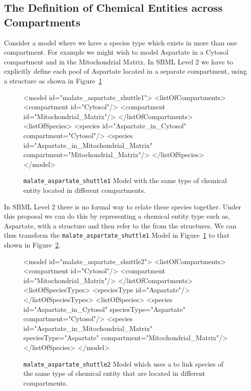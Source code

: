 \documentclass{cekarticle}
\begin{document}
\subsection{The Definition of Chemical Entities across Compartments}
\label{sec:commonspecies}

Consider a model where we have a species type which exists in more than one compartment.
For example we might wish to model Aspartate in a Cytosol compartment and in the Mitochondrial Matrix.
In SBML Level 2 we have to explicitly define each pool of Aspartate located in a separate compartment,
using a  structure as shown in Figure~\ref{fig:malate_aspartate_shuttle1-xml}

\begin{figure}[h]
\begin{example}
<model id="malate_aspartate_shuttle1">
    <listOfCompartments>
        <compartment id="Cytosol"/>
        <compartment id="Mitochondrial_Matrix"/>
    </listOfCompartments>
    <listOfSpecies>
        <species id="Aspartate_in_Cytosol" compartment="Cytosol"/>
        <species id="Aspartate_in_Mitochondrial_Matrix" compartment="Mitochondrial_Matrix"/>
    </listOfSpecies>
</model>
\end{example}
\caption{\texttt{malate\_aspartate\_shuttle1} Model with the same type of chemical entity located in
different compartments.}
\label{fig:malate_aspartate_shuttle1-xml}
\end{figure}

In SBML Level 2 there is no formal way to relate these species together.  Under this proposal
we can do this by representing a chemical entity type such as, Aspartate,
with a  structure and then
refer to the  from the  structures.  We can thus transform the
\texttt{malate\_aspartate\_shuttle1} Model in Figure~\ref{fig:malate_aspartate_shuttle1-xml} to that
shown in Figure~\ref{fig:malate_aspartate_shuttle2-xml}.

\begin{figure}[h]
\begin{example}
<model id="malate_aspartate_shuttle2">
    <listOfCompartments>
        <compartment id="Cytosol"/>
        <compartment id="Mitochondrial_Matrix"/>
    </listOfCompartments>
    <listOfSpeciesTypes>
        <speciesType id="Aspartate"/>
    </listOfSpeciesTypes>
    <listOfSpecies>
        <species
            id="Aspartate_in_Cytosol"
            speciesType="Aspartate"
            compartment="Cytosol"/>
        <species
            id="Aspartate_in_Mitochondrial_Matrix"
            speciesType="Aspartate"
            compartment="Mitochondrial_Matrix"/>
    </listOfSpecies>
</model>
\end{example}
\caption{\texttt{malate\_aspartate\_shuttle2} Model which uses a  to link species of
the same type of chemical entity that are located in different compartments.}
\label{fig:malate_aspartate_shuttle2-xml}
\end{figure}
\end{document}
